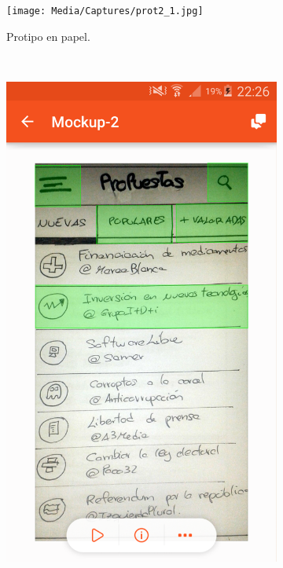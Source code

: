 \begin{enumerate}
	\begin{figure}[H]
        \centering
        \begin{subfigure}[b]{0.3\textwidth}
                \texttt{[image: Media/Captures/prot2\_1.jpg]}
                \caption{Protipo en papel.}
                \label{fig:quipDesktop}
        \end{subfigure}
        ~
        \begin{subfigure}[b]{0.3\textwidth}
                \includegraphics[width=\textwidth]{Media/Captures/prot2_2.png}

\end{subfigure}
\end{figure}
\end{enumerate}
